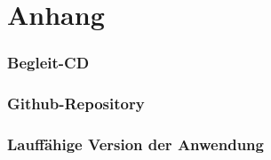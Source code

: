 \chapter{Anhang}
\subsection{Begleit-CD}

\subsection{Github-Repository}

\subsection{Lauffähige Version der Anwendung}
